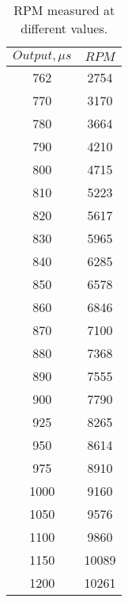 \begin{table}[H]
\centering
\begin{tabular}{|c|c|}
\hline
$Output,\mu s$ 	& $RPM$ \\ \hline
762 			& 2754	\\ \hline
770				& 3170	\\ \hline
780				& 3664	\\ \hline
790				& 4210	\\ \hline
800 			& 4715  \\ \hline
810 			& 5223	\\ \hline
820 			& 5617  \\ \hline
830				& 5965 	\\ \hline
840				& 6285	\\ \hline
850 			& 6578	\\ \hline
860 			& 6846	\\ \hline
870 			& 7100	\\ \hline
880 			& 7368	\\ \hline
890 			& 7555	\\ \hline
900 			& 7790	\\ \hline
925 			& 8265	\\ \hline
950 			& 8614	\\ \hline
975 			& 8910	\\ \hline
1000 			& 9160	\\ \hline
1050 			& 9576	\\ \hline
1100 			& 9860	\\ \hline
1150 			& 10089	\\ \hline
1200			& 10261	\\ \hline
\end{tabular}
\caption{RPM measured at different values.}
\label{RPMTable}
\end{table}

